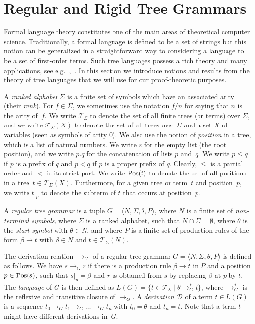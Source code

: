 \documentclass{LMCS}
\theoremstyle{plain}
\theoremstyle{definition}
\def\set#1{\{#1\}}
\def\tuple#1{\langle#1\rangle}
\newcommand{\Lang}[1]{L(#1)}	\newcommand{\Gram}[1]{\mathrm{G}(#1)}	\newcommand{\Gramreg}[1]{\mathrm{G}_0(#1)}
\newcommand{\TR}[1]{\mathcal{T}_{#1}}
\newcommand{\TRV}[2]{\mathcal{T}_{#1}(#2)}
\newcommand{\DD}{\mathcal{D}}
\newcommand{\derel}[1]{\mathbin{\rightarrow_{#1}}}
\newcommand{\sderel}[1]{\mathbin{\rightarrow_{#1}^*}}
\newcommand{\atpos}[2]{#1|_{#2}}
\begin{document}
\section{Regular and Rigid Tree Grammars}\label{sec.grammars}

Formal language theory constitutes one of the main areas of
theoretical computer science.  Traditionally, a formal language is
defined to be a set of strings but this notion can be generalized in a
straightforward way to considering a language to be a set of
first-order terms. Such tree languages possess a rich theory and many
applications, see e.g.~\cite{Gecseg97Tree},~\cite{Comon07Tree}. In
this section we introduce notions and results from the theory of tree
languages that we will use for our proof-theoretic purposes.

A \emph{ranked alphabet} $\Sigma$ is a finite set of symbols which
have an associated arity (their \emph{rank}). For $f\in\Sigma$, we
sometimes use the notation $f/n$ for saying that $n$ is the arity
of~$f$. We write $\TR{\Sigma}$ to denote the set of all finite trees
(or terms) over $\Sigma$, and we write $\TRV{\Sigma}{X}$ to denote the
set of all trees over $\Sigma$ and a set $X$ of variables (seen as
symbols of arity 0).  We also use the notion of \emph{position} in a
tree, which is a list of natural numbers. We write $\varepsilon$ for
the empty list (the root position), and we write $p.q$ for the
concatenation of lists $p$ and~$q$. We write $p\le q$ if $p$ is a
prefix of $q$ and $p<q$ if $p$ is a proper prefix of $q$. Clearly,
$\le$ is a partial order and $<$ is its strict part. We write
$\mathrm{Pos}(t)$ to denote the set of all positions in a
tree~$t\in\TRV{\Sigma}{X}$. Furthermore, for a given tree or term~$t$
and position~$p$, we write $\atpos{t}{p}$ to denote the subterm of $t$
that occurs at position~$p$.

\begin{defi}
  A \emph{regular tree grammar} is a tuple $G=\tuple{N,\Sigma,\theta,P}$,
  where $N$ is a finite set of \emph{non-terminal symbols}, where
  $\Sigma$ is a ranked alphabet, such that $N\cap\Sigma=\emptyset$,
  where $\theta$ is the \emph{start symbol} with $\theta\in N$, and where $P$ is a finite
  set of production rules of the form $\beta\to t$ with $\beta \in N$ and 
  $t\in\TRV{\Sigma}{N}$.
\end{defi}

The derivation relation
$\derel{G}$ of a regular
tree grammar $G=\tuple{N,\Sigma,\theta,P}$ is defined as follows. We
have $s\derel{G} r$ if there is a production rule $\beta\to t$ in $P$
and a position $p\in\mathrm{Pos}(s)$, such that $\atpos{s}{p} = \beta$ and $r$
is obtained from $s$ by replacing $\beta$ at $p$ by $t$. The
\emph{language} of $G$ is then defined as
$\Lang{G}=\set{t\in\TR{\Sigma}\mid\theta\sderel{G}t}$, where
$\sderel{G}$ is the reflexive and transitive closure of $\derel{G}$. A
\emph{derivation $\DD$} of a term $t\in\Lang{G}$ is a sequence
$t_0\derel{G}t_1\derel{G}\ldots\derel{G}t_n$ with $t_0=\theta$ and
$t_n=t$. Note that a term $t$ might have different derivations in~$G$.
\end{document}
